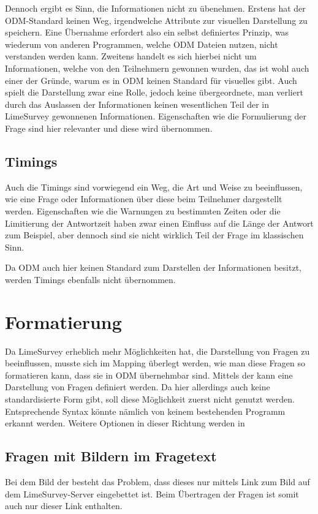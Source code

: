 Dennoch ergibt es Sinn, die Informationen nicht zu übenehmen.
Erstens hat der ODM-Standard keinen Weg, irgendwelche Attribute zur visuellen Darstellung zu speichern.
Eine Übernahme erfordert also ein selbst definiertes Prinzip, was wiederum von anderen Programmen, welche ODM Dateien nutzen, nicht verstanden werden kann.
Zweitens handelt es sich hierbei nicht um Informationen, welche von den Teilnehmern gewonnen wurden, das ist wohl auch einer der Gründe, warum es in ODM keinen Standard für visuelles gibt.
Auch spielt die Darstellung zwar eine Rolle, jedoch keine übergeordnete, man verliert durch das Auslassen der Informationen keinen wesentlichen Teil der in LimeSurvey gewonnenen Informationen.
Eigenschaften wie die Formulierung der Frage sind hier relevanter und diese wird übernommen.

\subsection{Timings}

Auch die Timings sind vorwiegend ein Weg, die Art und Weise zu beeinflussen, wie eine Frage oder Informationen über diese beim Teilnehmer dargestellt werden.
Eigenschaften wie die Warnungen zu bestimmten Zeiten oder die Limitierung der Antwortzeit haben zwar einen Einfluss auf die Länge der Antwort zum Beispiel, aber dennoch sind sie nicht wirklich Teil der Frage im klassischen Sinn.

Da ODM auch hier keinen Standard zum Darstellen der Informationen besitzt, werden Timings ebenfalls nicht übernommen.

\section{Formatierung}

Da LimeSurvey erheblich mehr Möglichkeiten hat, die Darstellung von Fragen zu beeinflussen, musste sich im Mapping überlegt werden, wie man diese Fragen so formatieren kann, dass sie in ODM übernehmbar sind.
Mittels der  %
kann eine Darstellung von Fragen definiert werden. Da hier allerdings auch keine standardisierte Form gibt, soll diese Möglichkeit zuerst nicht genutzt werden.
Entsprechende Syntax könnte nämlich von keinem bestehenden Programm erkannt werden.
Weitere Optionen in dieser Richtung werden in %

\subsection{Fragen mit Bildern im Fragetext}
Bei dem Bild der  besteht das Problem, dass dieses nur mittels Link zum Bild auf dem LimeSurvey-Server eingebettet ist.
Beim Übertragen der Fragen ist somit auch nur dieser Link enthalten.

